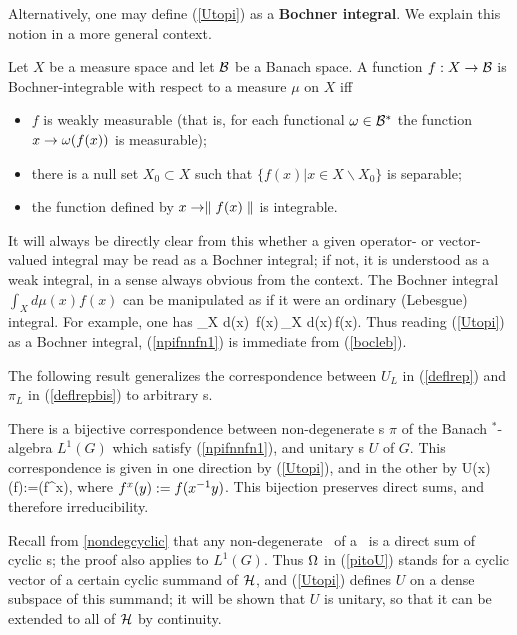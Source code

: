 Alternatively, one may define (\ref{Utopi}) as a {\bf Bochner integral}.
We explain this notion in a more general context. 
\begin{Definition}
Let $X$ be a measure
space and let ${\cal B}$ be a  Banach space.
 A function $f:X\rightarrow {\cal B}$
 is Bochner-integrable with respect to a measure $\mu$ on $X$ iff 
\begin{itemize}
\item 
$f$ is weakly measurable (that is, for each functional $\omega\in {\cal B}^*$
the function $x\rightarrow \omega(f(x))$ is measurable);
\item
 there is
a null set $X_0\subset X$ such that $\{f(x)|x\in X\backslash
X_0\}$ is separable; 
\item
 the function defined by $x\rightarrow \parallel f(x)\parallel$
is integrable.  
\end{itemize}
\end{Definition}

It will always be directly clear from this whether a
given operator- or vector-valued integral may be read as a Bochner
integral; if not, it is understood as a weak integral, in a sense
always obvious from the context.  The Bochner integral $\int_X
d\mu(x) f(x)$ can be manipulated as if it were an ordinary
(Lebesgue) integral. For example, one has 
\be
\n \int_X d\mu(x)\, f(x)\n\,\leq \int_X d\mu(x)\,\n  f(x)\n. 
\ee
Thus reading (\ref{Utopi}) as a  Bochner integral, (\ref{npifnnfn1}) 
is immediate
from (\ref{bocleb}).

 The following result generalizes the correspondence between $U_L$ in
(\ref{deflrep}) and $\pi_L$ in (\ref{deflrepbis}) to arbitrary \rep s. 
\begin{Theorem}
There is a bijective correspondence between non-degene\-ra\-te \rep s
$\pi$ of the Banach $\mbox{}^*$-algebra $L^1(G)$ which satisfy
(\ref{npifnnfn1}), and unitary \rep s $U$ of $G$.  This
correspondence is given in one direction by (\ref{Utopi}), and in the
other by
\be
U(x)\pi(f)\Om:=\pi(f^x)\Om, 
\ee
where $f^x(y):=f(x^{-1} y)$. 
This bijection preserves direct sums, and therefore
irreducibility. \end{Theorem}

  Recall from \ref{nondegcyclic} that any non-degenerate \rep\ of a \ca\ is a
direct sum of cyclic \rep s; the proof also applies to
$L^1(G)$. Thus $\Omega$ in (\ref{pitoU}) stands for a cyclic vector of
a certain cyclic summand of ${\cal H}$, and (\ref{Utopi}) defines $U$ on a
dense subspace of this summand; it will be shown that $U$ is unitary,
so that it can be extended to all of ${\cal H}$ by continuity.

